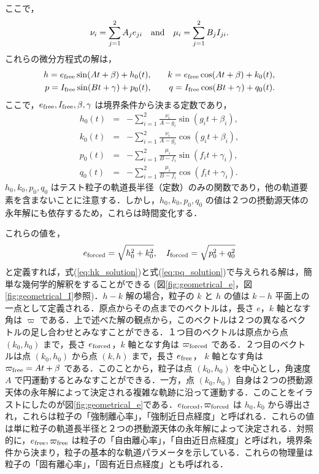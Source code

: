 \documentclass[11pt,a4paper,oneside,onecolumn]{jreport}
\begin{document}
ここで，
\begin{equation}
\nu_i = \sum_{j = 1}^2 A_j e_{ji} \quad {\rm and} \quad \mu_i = \sum_{j=1}^2 B_j I_{ji}. \label{eq:nu_mu}
\end{equation}
これらの微分方程式の解は，
\begin{eqnarray}
h = e_{\rm free} \sin (A t + \beta) + h_0 (t), & \quad & k = e_{\rm free} \cos (A t + \beta) + k_0 (t), \label{eq:hk_solution} \\
p = I_{\rm free} \sin (B t + \gamma) + p_0 (t), & \quad & q = I_{\rm free} \cos (B t + \gamma) + q_0 (t). \label{eq:pq_solution}
\end{eqnarray}
ここで，$e_{\rm free}, I_{\rm free}, \beta, \gamma$ は境界条件から決まる定数であり，
\begin{eqnarray}
h_0 (t) & = & - \sum_{i = 1}^2 \frac{\nu_i}{A - g_i} \sin (g_i t + \beta_i), \label{eq:h_0} \\
k_0 (t) & = & - \sum_{i = 1}^2 \frac{\nu_i}{A - g_i} \cos (g_i t + \beta_i), \label{eq:k_0} \\
p_0 (t) & = & - \sum_{i = 1}^2 \frac{\mu_i}{B - f_i} \sin (f_i t + \gamma_i), \label{eq:p_0} \\
q_0 (t) & = & - \sum_{i = 1}^2 \frac{\mu_i}{B - f_i} \cos (f_i t + \gamma_i). \label{eq:q_0} 
\end{eqnarray}
$h_0, k_0, p_0, q_0$ はテスト粒子の軌道長半径（定数）のみの関数であり，他の軌道要素を含まないことに注意する．しかし，$h_0, k_0, p_0, q_0$ の値は２つの摂動源天体の永年解にも依存するため，これらは時間変化する．

これらの値を，
\begin{equation}
e_{\rm forced} = \sqrt{h_0^2 + k_0^2}, \quad I_{\rm forced} = \sqrt{p_0^2 + q_0^2} \label{eq:forced}
\end{equation}
と定義すれば，式(\ref{eq:hk_solution})と式(\ref{eq:pq_solution})で与えられる解は，簡単な幾何学的解釈をすることができる (図\ref{fig:geometrical_e}，図\ref{fig:geometrical_I}参照)．$h - k$ 解の場合，粒子の $k$ と $h$ の値は $k - h$ 平面上の一点として定義される．原点からその点までのベクトルは，長さ $e$，$k$ 軸となす角は $\varpi$ である．上で述べた解の観点から，このベクトルは２つの異なるベクトルの足し合わせとみなすことができる．１つ目のベクトルは原点から点 $(k_0, h_0)$ まで，長さ $e_{\rm forced}$，$k$ 軸となす角は $\varpi_{\rm forced}$ である．２つ目のベクトルは点 $(k_0, h_0)$ から点 $(k, h)$ まで，長さ $e_{\rm free}$， $k$ 軸となす角は $\varpi_{\rm free} = A t + \beta$ である．このことから，粒子は点 $(k_0, h_0)$ を中心とし，角速度 $A$ で円運動するとみなすことができる．一方，点 $(k_0, h_0)$ 自身は２つの摂動源天体の永年解によって決定される複雑な軌跡に沿って運動する．このことをイラストにしたのが図\ref{fig:geometrical_e}である．$e_{\rm forced}, \varpi_{\rm forced}$ は $h_0, k_0$ から導出され，これらは粒子の「強制離心率」，「強制近日点経度」と呼ばれる．これらの値は単に粒子の軌道長半径と２つの摂動源天体の永年解によって決定される．対照的に，$e_{\rm free}, \varpi_{\rm free}$ は粒子の「自由離心率」，「自由近日点経度」と呼ばれ，境界条件から決まり，粒子の基本的な軌道パラメータを示している．これらの物理量は粒子の「固有離心率」，「固有近日点経度」とも呼ばれる．
\end{document}
